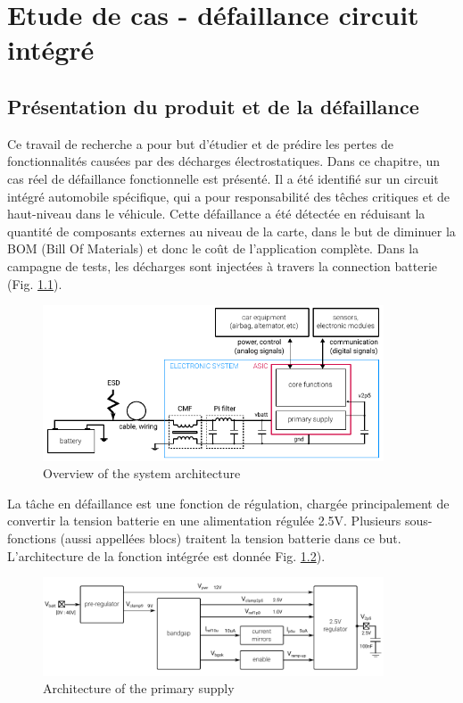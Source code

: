 \chapter{Etude de cas - défaillance circuit intégré}
\label{chap:3}
\section{Présentation du produit et de la défaillance}

Ce travail de recherche a pour but d'étudier et de prédire les pertes de fonctionnalités causées par des décharges électrostatiques.
Dans ce chapitre, un cas réel de défaillance fonctionnelle est présenté.
Il a été identifié sur un circuit intégré automobile spécifique, qui a pour responsabilité des têches critiques et de haut-niveau dans le véhicule.
Cette défaillance a été détectée en réduisant la quantité de composants externes au niveau de la carte, dans le but de diminuer la BOM (Bill Of Materials) et donc le coût de l'application complète.
Dans la campagne de tests, les décharges sont injectées à travers la connection batterie (Fig. \ref{fig:system_architecture}).

\begin{figure}[!h]
  \centering
  \includegraphics[width=0.9\textwidth]{src/1/figures/architecture_system.pdf}
  \caption{Overview of the system architecture}
  \label{fig:system_architecture}
\end{figure}

La tâche en défaillance est une fonction de régulation, chargée principalement de convertir la tension batterie en une alimentation régulée 2.5V.
Plusieurs sous-fonctions (aussi appellées blocs) traitent la tension batterie dans ce but.
L'architecture de la fonction intégrée est donnée Fig. \ref{fig:monitored_function}).

\begin{figure}[!h]
  \centering
  \includegraphics[width=0.9\textwidth]{src/1/figures/monitored_function.pdf}
  \caption{Architecture of the primary supply}
  \label{fig:monitored_function}
\end{figure}

